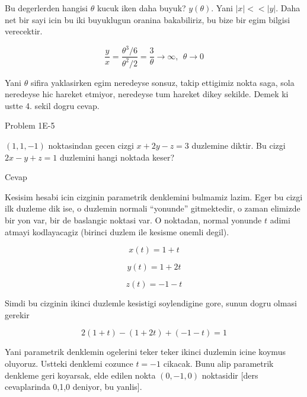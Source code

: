 \documentclass[12pt,fleqn]{article}
\begin{document}
Bu degerlerden hangisi $\theta$ kucuk iken daha buyuk? $y(\theta)$. Yani
$|x| << |y|$. Daha net bir sayi icin bu iki buyuklugun oranina bakabiliriz,
bu bize bir egim bilgisi verecektir. 

\[ \frac{y}{x} = \frac{\theta^3/6}{\theta^2/2 } = 
\frac{3}{\theta} \to \infty, \ \ \theta \to 0
\]

Yani $\theta$ sifira yaklasirken egim neredeyse sonsuz, takip ettigimiz
nokta saga, sola neredeyse hic hareket etmiyor, neredeyse tum hareket dikey
sekilde. Demek ki ustte 4. sekil dogru cevap. 

Problem 1E-5 

$(1,1,-1)$ noktasindan gecen cizgi $x+2y - z = 3$ duzlemine diktir. Bu
cizgi $2x - y + z = 1$ duzlemini hangi noktada keser? 

Cevap

Kesisim hesabi icin cizginin parametrik denklemini bulmamiz lazim. Eger bu
cizgi ilk duzleme dik ise, o duzlemin normali ``yonunde'' gitmektedir, o
zaman elimizde bir yon var, bir de baslangic noktasi var. O noktadan,
normal yonunde $t$ adimi atmayi kodlayacagiz (birinci duzlem ile kesisme
onemli degil). 

\[ x(t) = 1 + t \]

\[ y(t) = 1 + 2t \]

\[ z(t) = -1 -t \]

Simdi bu cizginin ikinci duzlemle kesistigi soylendigine gore, sunun dogru
olmasi gerekir

\[ 2(1+t) - (1+2t) + (-1-t) = 1 \]

Yani parametrik denklemin ogelerini teker teker ikinci duzlemin icine
koymus oluyoruz. Ustteki denklemi cozunce $t=-1$ cikacak. Bunu alip
parametrik denkleme geri koyarsak, elde edilen nokta $(0,-1,0)$
noktasidir [ders cevaplarinda 0,1,0 deniyor, bu yanlis]. 
\end{document}
